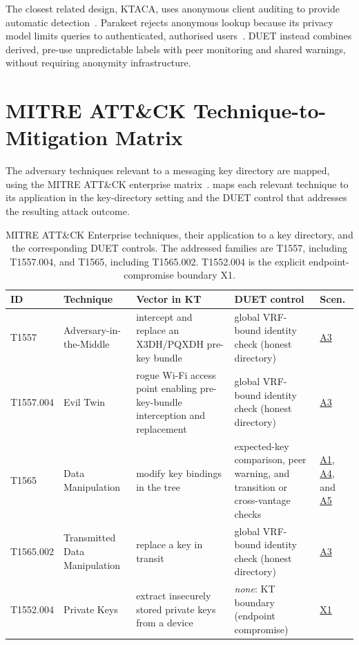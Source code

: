The closest related design, KTACA, uses anonymous client auditing to provide automatic
detection~\cite{yadav2022fakekey}. Parakeet rejects anonymous lookup because its privacy model
limits queries to authenticated, authorised users~\cite{malvai2023parakeet-eprint}. DUET instead combines derived, pre-use unpredictable labels
with peer monitoring and shared warnings, without requiring anonymity infrastructure.

\section{MITRE ATT\&CK Technique-to-Mitigation Matrix}\label{sec:sec-mitre}

The adversary techniques relevant to a messaging key directory are mapped, using the MITRE
ATT\&CK enterprise matrix~\cite{mitre-attack}.  maps each relevant
technique to its application in the key-directory setting and the DUET control that addresses the
resulting attack outcome.

\begin{table}[H]
\centering
\caption[MITRE ATT\&CK techniques and the corresponding DUET controls.]{MITRE ATT\&CK Enterprise
techniques, their application to a key directory, and the corresponding DUET controls. The addressed
families are T1557, including T1557.004, and T1565, including T1565.002. T1552.004 is the explicit
endpoint-compromise boundary X1.}
\label{tab:sec-mitre}
\setlength{\extrarowheight}{2pt}
\footnotesize
\begin{tabular}{@{}>{\raggedright\arraybackslash}p{1.7cm}>{\raggedright\arraybackslash}p{2.2cm}>{\raggedright\arraybackslash}p{3.1cm}>{\raggedright\arraybackslash}p{4.5cm}l@{}}
\toprule
ID & Technique & Vector in KT & DUET control & Scen. \\
\midrule
T1557 & Adversary-in-the-Middle & intercept and replace an X3DH/PQXDH pre-key bundle & global VRF-bound identity check (honest directory) & \hyperref[sc:threat-a3]{A3} \\
T1557.004 & Evil Twin & rogue Wi-Fi access point enabling pre-key-bundle interception and replacement & global VRF-bound identity check (honest directory) & \hyperref[sc:threat-a3]{A3} \\
T1565 & Data Manipulation & modify key bindings in the tree & expected-key comparison, peer warning, and transition or cross-vantage checks & \hyperref[sc:threat-a1]{A1}, \hyperref[sc:threat-a4]{A4}, and \hyperref[sc:threat-a5]{A5} \\
T1565.002 & Transmitted Data Manipulation & replace a key in transit & global VRF-bound identity check (honest directory) & \hyperref[sc:threat-a3]{A3} \\
T1552.004 & Private Keys & extract insecurely stored private keys from a device & \emph{none}: KT boundary (endpoint compromise) & \hyperref[sc:threat-x1]{X1} \\
\bottomrule
\end{tabular}
\end{table}

